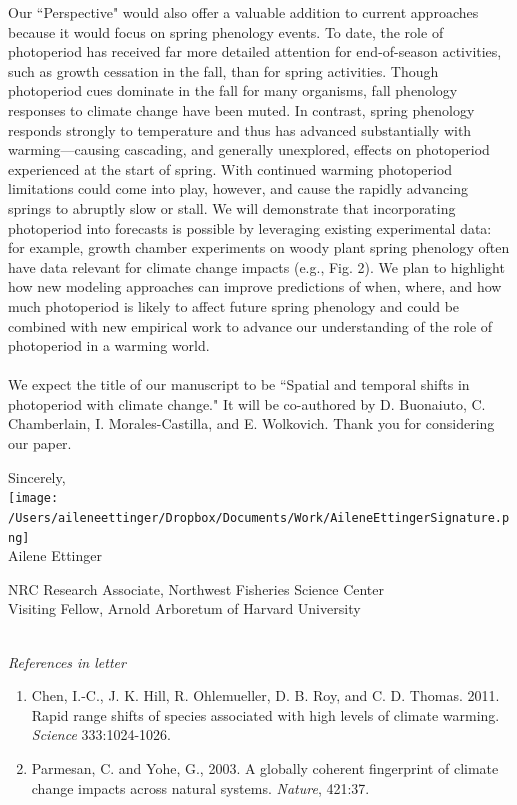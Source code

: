 \documentclass[10.7pt,a4paper]{letter}
\begin{document}
\begin{letter}{}
Our ``Perspective" would also offer a valuable addition to current approaches because it would focus on spring phenology events. To date, the role of photoperiod has received far more detailed attention for end-of-season activities, such as growth cessation in the fall, than for spring activities. Though photoperiod cues dominate in the fall for many organisms, fall phenology responses to climate change have been muted. In contrast, spring phenology responds strongly to temperature and thus has advanced substantially with warming---causing cascading, and generally unexplored, effects on photoperiod experienced at the start of spring. With continued warming photoperiod limitations could come into play, however, and cause the rapidly advancing springs to abruptly slow or stall. We will demonstrate that incorporating photoperiod into forecasts is possible by leveraging existing experimental data: for example, growth chamber experiments on woody plant spring phenology often have data relevant for climate change impacts (e.g., Fig. 2). We plan to highlight how new modeling approaches can improve predictions of when, where, and how much photoperiod is likely to affect future spring phenology and could be combined with new empirical work to advance our understanding of the role of photoperiod in a warming world. 
\\
\\
We expect the title of our manuscript to be ``Spatial and temporal shifts in photoperiod with climate change."  It will be co-authored by D. Buonaiuto, C. Chamberlain, I. Morales-Castilla, and E. Wolkovich. Thank you for considering our paper.

Sincerely,\\
\texttt{[image: /Users/aileneettinger/Dropbox/Documents/Work/AileneEttingerSignature.png]} \\
Ailene Ettinger
\\
\begin{footnotesize}
NRC Research Associate, Northwest Fisheries Science Center
\\
Visiting Fellow, Arnold Arboretum of Harvard University
\end{footnotesize}
\\
\newpage
\noindent \emph{References in letter}
\begin{footnotesize}
\begin{enumerate}
\item Chen, I.-C., J. K. Hill, R. Ohlemueller, D. B. Roy, and C. D. Thomas. 2011. Rapid range shifts of species associated with high levels of climate warming.  \emph{Science} 333:1024-1026.
\item Parmesan, C. and Yohe, G., 2003. A globally coherent fingerprint of climate change impacts across natural systems.  \emph{Nature}, 421:37.


\end{enumerate}
\end{footnotesize}
\end{letter}
\end{document}
